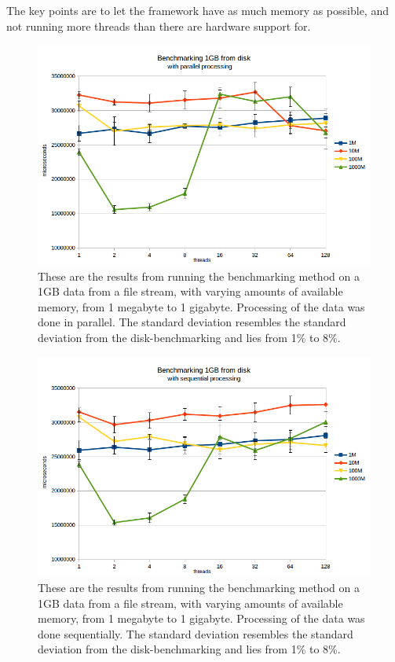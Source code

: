 \documentclass[a4paper]{article}
\begin{document}
The key points are to let the framework have as much memory as possible, and not running more threads than there are hardware support for. 

\begin{figure}
	\begin{adjustwidth}{-0.5in}{-0.5in}
    \centering
     \includegraphics[scale=0.7]{../test_results/disk_par.png}
  	\caption{These are the results from running the benchmarking method on a 1GB data from a file stream, with varying amounts of available memory, from 1 megabyte to 1 gigabyte. Processing of the data was done in parallel. The standard deviation resembles the standard deviation from the disk-benchmarking and lies from 1\% to 8\%.}
	\label{figure:disk-par}
	\end{adjustwidth}
\end{figure}

\begin{figure}
	\begin{adjustwidth}{-0.5in}{-0.5in}
    \centering
     \includegraphics[scale=0.7]{../test_results/disk_seq.png}
  	\caption{These are the results from running the benchmarking method on a 1GB data from a file stream, with varying amounts of available memory, from 1 megabyte to 1 gigabyte. Processing of the data was done sequentially. The standard deviation resembles the standard deviation from the disk-benchmarking and lies from 1\% to 8\%.}
	\label{figure:disk-seq}
	\end{adjustwidth}
\end{figure}
\end{document}
